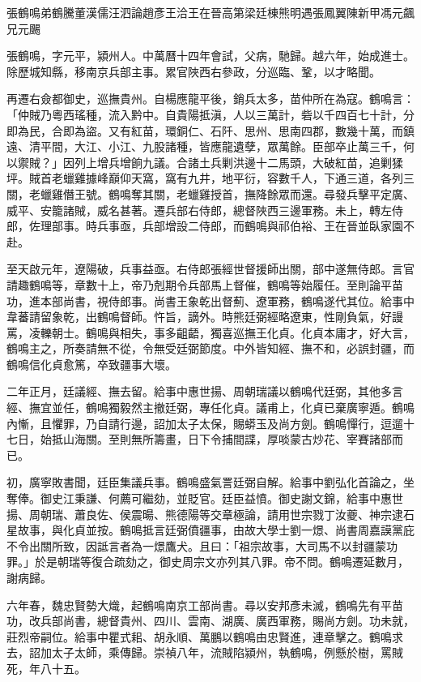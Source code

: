 
\begin{pinyinscope}
張鶴鳴弟鶴騰董漢儒汪泗論趙彥王洽王在晉高第梁廷棟熊明遇張鳳翼陳新甲馮元飆兄元颺

張鶴鳴，字元平，潁州人。中萬曆十四年會試，父病，馳歸。越六年，始成進士。除歷城知縣，移南京兵部主事。累官陜西右參政，分巡臨、鞏，以才略聞。

再遷右僉都御史，巡撫貴州。自楊應龍平後，銷兵太多，苗仲所在為寇。鶴鳴言：「仲賊乃粵西瑤種，流入黔中。自貴陽抵滇，人以三萬計，砦以千四百七十計，分即為民，合即為盜。又有紅苗，環銅仁、石阡、思州、思南四郡，數幾十萬，而鎮遠、清平間，大江、小江、九股諸種，皆應龍遺孽，眾萬餘。臣部卒止萬三千，何以禦賊？」因列上增兵增餉九議。合諸土兵剿洪邊十二馬頭，大破紅苗，追剿猱坪。賊首老蠟雞據峰巔仰天窩，窩有九井，地平衍，容數千人，下通三道，各列三關，老蠟雞僭王號。鶴鳴奪其關，老蠟雞授首，撫降餘眾而還。尋發兵擊平定廣、威平、安籠諸賊，威名甚著。遷兵部右侍郎，總督陜西三邊軍務。未上，轉左侍郎，佐理部事。時兵事亟，兵部增設二侍郎，而鶴鳴與祁伯裕、王在晉並臥家園不赴。

至天啟元年，遼陽破，兵事益亟。右侍郎張經世督援師出關，部中遂無侍郎。言官請趣鶴鳴等，章數十上，帝乃剋期令兵部馬上督催，鶴鳴等始履任。至則論平苗功，進本部尚書，視侍郎事。尚書王象乾出督薊、遼軍務，鶴鳴遂代其位。給事中韋蕃請留象乾，出鶴鳴督師。忤旨，謫外。時熊廷弼經略遼東，性剛負氣，好謾罵，凌轢朝士。鶴鳴與相失，事多齟齬，獨喜巡撫王化貞。化貞本庸才，好大言，鶴鳴主之，所奏請無不從，令無受廷弼節度。中外皆知經、撫不和，必誤封疆，而鶴鳴信化貞愈篤，卒致疆事大壞。

二年正月，廷議經、撫去留。給事中惠世揚、周朝瑞議以鶴鳴代廷弼，其他多言經、撫宜並任，鶴鳴獨毅然主撤廷弼，專任化貞。議甫上，化貞已棄廣寧遁。鶴鳴內慚，且懼罪，乃自請行邊，詔加太子太保，賜蟒玉及尚方劍。鶴鳴憚行，逗遛十七日，始抵山海關。至則無所籌畫，日下令捕間諜，厚啖蒙古炒花、宰賽諸部而已。

初，廣寧敗書聞，廷臣集議兵事。鶴鳴盛氣詈廷弼自解。給事中劉弘化首論之，坐奪俸。御史江秉謙、何薦可繼劾，並貶官。廷臣益憤。御史謝文錦，給事中惠世揚、周朝瑞、蕭良佐、侯震暘、熊德陽等交章極論，請用世宗戮丁汝夔、神宗逮石星故事，與化貞並按。鶴鳴抵言廷弼僨疆事，由故大學士劉一燝、尚書周嘉謨黨庇不令出關所致，因詆言者為一燝鷹犬。且曰：「祖宗故事，大司馬不以封疆蒙功罪。」於是朝瑞等復合疏劾之，御史周宗文亦列其八罪。帝不問。鶴鳴遷延數月，謝病歸。

六年春，魏忠賢勢大熾，起鶴鳴南京工部尚書。尋以安邦彥未滅，鶴鳴先有平苗功，改兵部尚書，總督貴州、四川、雲南、湖廣、廣西軍務，賜尚方劍。功未就，莊烈帝嗣位。給事中瞿式耜、胡永順、萬鵬以鶴鳴由忠賢進，連章擊之。鶴鳴求去，詔加太子太師，乘傳歸。崇禎八年，流賊陷潁州，執鶴鳴，例懸於樹，罵賊死，年八十五。


\end{pinyinscope}
